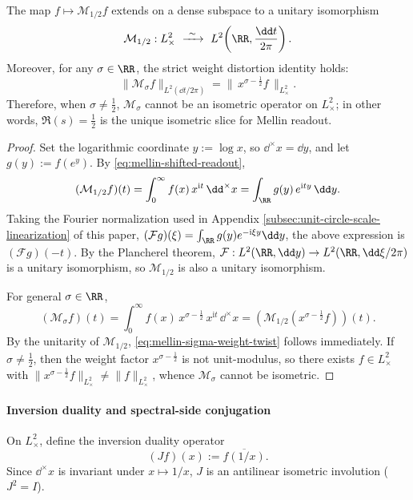 \begin{theorem}\label{thm:mellin-unitary-slice-unique}
The map \(f\mapsto \mathcal{M}_{1/2}f\) extends on a dense subspace to a unitary isomorphism
\[
\mathcal{M}_{1/2}:L^{2}_{\times}\ \xrightarrow{\ \sim\ }\ L^{2}\!\left(\RR,\frac{\dd t}{2\pi}\right).
\]
Moreover, for any \(\sigma\in\RR\), the strict weight distortion identity holds:
\begin{equation}\label{eq:mellin-sigma-weight-twist}
\|\mathcal{M}_{\sigma}f\|_{L^{2}(\dd t/2\pi)}
=
\|\,x^{\sigma-\frac12}f\,\|_{L^{2}_{\times}}.
\end{equation}
Therefore, when \(\sigma\neq\tfrac12\), \(\mathcal{M}_{\sigma}\) cannot be an isometric operator on \(L^{2}_{\times}\); in other words, \(\Re(s)=\tfrac12\) is the unique isometric slice for Mellin readout.
\end{theorem}

\begin{proof}
Set the logarithmic coordinate \(y:=\log x\), so \(\dd^{\times}x=\dd y\), and let \(g(y):=f(e^{y})\).
By \eqref{eq:mellin-shifted-readout},
\[
(\mathcal{M}_{1/2}f)(t)
=\int_{0}^{\infty} f(x)\,x^{\mathrm{i}t}\,\dd^{\times}x
=\int_{\RR} g(y)\,e^{\mathrm{i}ty}\,\dd y.
\]
Taking the Fourier normalization used in Appendix \ref{subsec:unit-circle-scale-linearization} of this paper,
\(
(\mathcal{F}g)(\xi)=\int_{\RR}g(y)e^{-\mathrm{i}\xi y}\dd y
\),
the above expression is \((\mathcal{F}g)(-\!t)\).
By the Plancherel theorem, \(\mathcal{F}:L^{2}(\RR,\dd y)\to L^{2}(\RR,\dd\xi/2\pi)\) is a unitary isomorphism, so \(\mathcal{M}_{1/2}\) is also a unitary isomorphism.
\par
For general \(\sigma\in\RR\),
\[
(\mathcal{M}_{\sigma}f)(t)
=\int_{0}^{\infty} f(x)\,x^{\sigma-\frac12}\,x^{\mathrm{i}t}\,\dd^{\times}x
=(\mathcal{M}_{1/2}(x^{\sigma-\frac12}f))(t).
\]
By the unitarity of \(\mathcal{M}_{1/2}\), \eqref{eq:mellin-sigma-weight-twist} follows immediately.
If \(\sigma\neq\tfrac12\), then the weight factor \(x^{\sigma-\frac12}\) is not unit-modulus, so there exists \(f\in L^{2}_{\times}\) with \(\|x^{\sigma-\frac12}f\|_{L^{2}_{\times}}\neq\|f\|_{L^{2}_{\times}}\), whence \(\mathcal{M}_{\sigma}\) cannot be isometric. \qedhere
\end{proof}

\paragraph{Inversion duality and spectral-side conjugation}
On \(L^{2}_{\times}\), define the inversion duality operator
\[
(Jf)(x):=\overline{f(1/x)}.
\]
Since \(\dd^{\times}x\) is invariant under \(x\mapsto 1/x\), \(J\) is an antilinear isometric involution (\(J^{2}=I\)).

